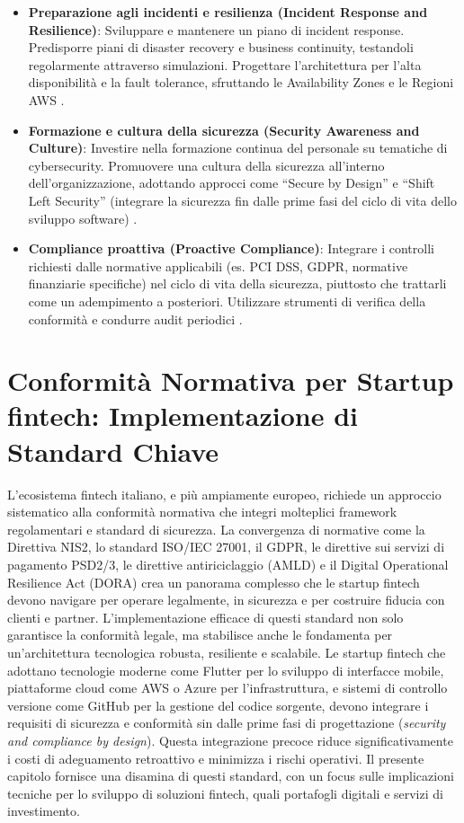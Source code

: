 \begin{itemize}
    \item \textbf{Preparazione agli incidenti e resilienza (Incident Response and Resilience)}: Sviluppare e mantenere un piano di incident response. Predisporre piani di disaster recovery e business continuity, testandoli regolarmente attraverso simulazioni. Progettare l'architettura per l'alta disponibilità e la fault tolerance, sfruttando le Availability Zones e le Regioni AWS \cite{awsWellArchitected}.
    \item \textbf{Formazione e cultura della sicurezza (Security Awareness and Culture)}: Investire nella formazione continua del personale su tematiche di cybersecurity. Promuovere una cultura della sicurezza all'interno dell'organizzazione, adottando approcci come \enquote{Secure by Design} e \enquote{Shift Left Security} (integrare la sicurezza fin dalle prime fasi del ciclo di vita dello sviluppo software) \cite{netguru2023}.
    \item \textbf{Compliance proattiva (Proactive Compliance)}: Integrare i controlli richiesti dalle normative applicabili (es. PCI DSS, GDPR, normative finanziarie specifiche) nel ciclo di vita della sicurezza, piuttosto che trattarli come un adempimento a posteriori. Utilizzare strumenti di verifica della conformità e condurre audit periodici \cite{netguru2023}.
\end{itemize}

\chapter{Conformità Normativa per Startup fintech: Implementazione di Standard Chiave}
\label{chap:compliance}

L'ecosistema fintech italiano, e più ampiamente europeo, richiede un approccio sistematico alla conformità normativa che integri molteplici framework regolamentari e standard di sicurezza. La convergenza di normative come la Direttiva NIS2, lo standard ISO/IEC 27001, il GDPR, le direttive sui servizi di pagamento PSD2/3, le direttive antiriciclaggio (AMLD) e il Digital Operational Resilience Act (DORA) crea un panorama complesso che le startup fintech devono navigare per operare legalmente, in sicurezza e per costruire fiducia con clienti e partner. L'implementazione efficace di questi standard non solo garantisce la conformità legale, ma stabilisce anche le fondamenta per un'architettura tecnologica robusta, resiliente e scalabile. Le startup fintech che adottano tecnologie moderne come Flutter per lo sviluppo di interfacce mobile, piattaforme cloud come AWS o Azure per l'infrastruttura, e sistemi di controllo versione come GitHub per la gestione del codice sorgente, devono integrare i requisiti di sicurezza e conformità sin dalle prime fasi di progettazione (\textit{security and compliance by design}). Questa integrazione precoce riduce significativamente i costi di adeguamento retroattivo e minimizza i rischi operativi. Il presente capitolo fornisce una disamina di questi standard, con un focus sulle implicazioni tecniche per lo sviluppo di soluzioni fintech, quali portafogli digitali e servizi di investimento.

